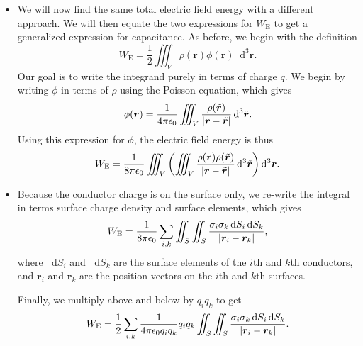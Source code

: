 \documentclass[11pt, a4paper]{article}
\newcommand{\diff}{\mathop{}\!\mathrm{d}} %
\newcommand{\dr}{\diff^{3} \r}  %
\newcommand{\dtr}{\diff^{3} \tilde{\r}}  %
\renewcommand{\vec}[1]{\bm{#1}} %
\renewcommand{\t}[1]{\tilde{#1}} %
\renewcommand{\r}{\vec{r}}
\newcommand{\ee}{\epsilon_{0}}  %
\begin{document}
\begin{itemize}
	\item We will now find the same total electric field energy with a different approach. We will then equate the two expressions for $ W_{\text{E}} $ to get a generalized expression for capacitance. As before, we begin with the definition
	\begin{equation*}
		W_{\text{E}} = \frac{1}{2}\iiint_{V} \rho(\r) \phi(\r) \dr.
	\end{equation*}
	Our goal is to write the integrand purely in terms of charge $ q $. We begin by writing $ \phi $ in terms of $ \rho $ using the Poisson equation, which gives
	\begin{equation*}
		\phi(\r) = \frac{1}{4\pi \ee}\iiint_{V}\frac{\rho(\t{\r})}{\abs{\r - \t{\r}}} \dtr.
	\end{equation*}
    Using this expression for $ \phi $, the electric field energy is thus
	\begin{equation*}
		W_{\text{E}} = \frac{1}{8\pi \ee} \iiint_{V}\left(\iiint_{V} \frac{\rho(\r)\rho(\t{\r})}{\abs{\r - \t{\r}}}\dtr \right) \dr.
	\end{equation*}
	
    \item Because the conductor charge is on the surface only, we re-write the integral in terms surface charge density and surface elements, which gives
	\begin{equation*}
		W_{\text{E}} = \frac{1}{8\pi \ee}\sum_{i, k} \iint_{S} \iint_{S} \frac{\sigma_{i}\sigma_{k}\diff S_{i}\diff S_{k}}{\abs{\r_{i} - \r_{k}}},
	\end{equation*}
	where $ \diff S_{i} $ and $ \diff S_{k} $ are the surface elements of the $ i $th and $ k $th conductors, and $ \r_{i} $ and $ \r_{k} $ are the position vectors on the $ i $th and $ k $th surfaces. 
	
	Finally, we multiply above and below by $ q_{i}q_{k} $ to get
	\begin{equation*}
		W_{\text{E}} = \frac{1}{2} \sum_{i, k} \frac{1}{4\pi \ee q_{i}q_{k}}q_{i}q_{k} \iint_{S} \iint_{S} \frac{\sigma_{i}\sigma_{k}\diff S_{i}\diff S_{k}}{\abs{\r_{i} - \r_{k}}}.
	\end{equation*}
	

\end{itemize}
\end{document}
